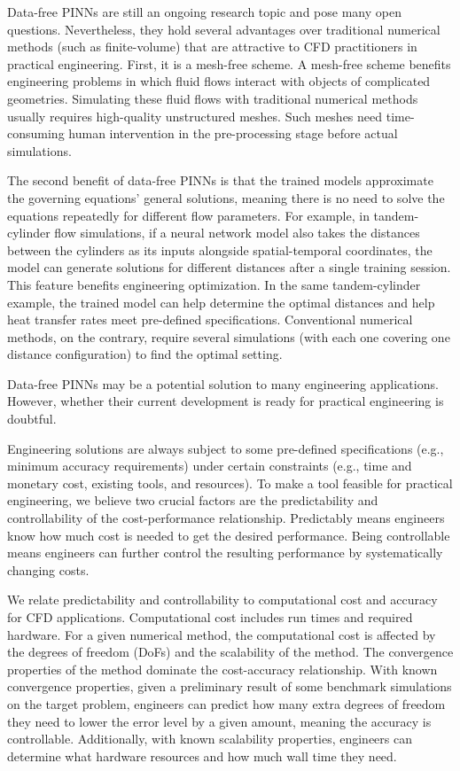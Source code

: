 
Data-free PINNs are still an ongoing research topic and pose many open questions.
Nevertheless, they hold several advantages over traditional numerical methods (such as finite-volume) that are attractive to CFD practitioners in practical engineering.
First, it is a mesh-free scheme.
A mesh-free scheme benefits engineering problems in which fluid flows interact with objects of complicated geometries.
Simulating these fluid flows with traditional numerical methods usually requires high-quality unstructured meshes.
Such meshes need time-consuming human intervention in the pre-processing stage before actual simulations.

The second benefit of data-free PINNs is that the trained models approximate the governing equations' general solutions, meaning there is no need to solve the equations repeatedly for different flow parameters.
For example, in tandem-cylinder flow simulations, if a neural network model also takes the distances between the cylinders as its inputs alongside spatial-temporal coordinates, the model can generate solutions for different distances after a single training session.
This feature benefits engineering optimization.
In the same tandem-cylinder example, the trained model can help determine the optimal distances and help heat transfer rates meet pre-defined specifications.
Conventional numerical methods, on the contrary, require several simulations (with each one covering one distance configuration) to find the optimal setting.

Data-free PINNs may be a potential solution to many engineering applications.
However, whether their current development is ready for practical engineering is doubtful.

Engineering solutions are always subject to some pre-defined specifications (e.g., minimum accuracy requirements) under certain constraints (e.g., time and monetary cost, existing tools, and resources).
To make a tool feasible for practical engineering, we believe two crucial factors are the predictability and controllability of the cost-performance relationship.
Predictably means engineers know how much cost is needed to get the desired performance.
Being controllable means engineers can further control the resulting performance by systematically changing costs.

We relate predictability and controllability to computational cost and accuracy for CFD applications.
Computational cost includes run times and required hardware.
For a given numerical method, the computational cost is affected by the degrees of freedom (DoFs) and the scalability of the method.
The convergence properties of the method dominate the cost-accuracy relationship.
With known convergence properties, given a preliminary result of some benchmark simulations on the target problem, engineers can predict how many extra degrees of freedom they need to lower the error level by a given amount, meaning the accuracy is controllable.
Additionally, with known scalability properties, engineers can determine what hardware resources and how much wall time they need.


